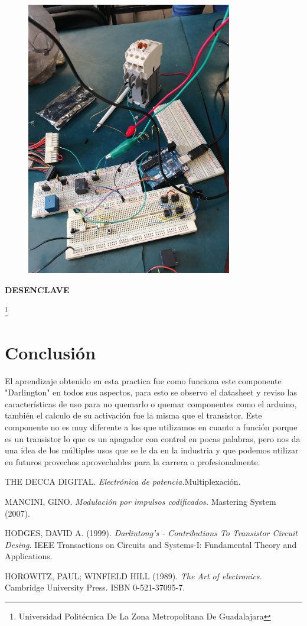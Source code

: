 \documentclass[11pt,a4paper]{article}
\begin{document}
\begin{figure}[hbtp]
\centering
\includegraphics[scale=0.50]{9.png}
\end{figure}

\textbf{DESENCLAVE}

\footnote{Universidad Politécnica De La Zona Metropolitana De Guadalajara} 

\newpage

\section{Conclusión}

El aprendizaje obtenido en esta practica fue como funciona este componente "Darlington" en todos sus aspectos, para esto se observo el datasheet y reviso las características de uso para no quemarlo o quemar componentes como el arduino, también el calculo de su activación fue la misma que el transistor. Este componente no es muy diferente a los que utilizamos en cuanto a función porque es un transistor lo que es un apagador con control en pocas palabras, pero nos da una idea de los múltiples usos que se le da en la industria y que podemos utilizar en futuros provechos aprovechables para la carrera o profesionalmente.


\begin{thebibliography}{X}

 \textsc{THE DECCA DIGITAL.} \textit{Electrónica de  potencia.}Multiplexación.

 \textsc{MANCINI, GINO.} \textit{Modulación por impulsos codificados.} 
Mastering System (2007).

 \textsc{HODGES, DAVID A. (1999).} \textit{Darlintong's - Contributions To Transistor Circuit Desing.} 
IEEE Transactions on Circuits and Systems-I: Fundamental Theory and Applications.

 \textsc{HOROWITZ, PAUL; WINFIELD HILL (1989).} \textit{The Art of electronics.} 
Cambridge University Press. ISBN 0-521-37095-7.


\end{thebibliography}


\end{document}
